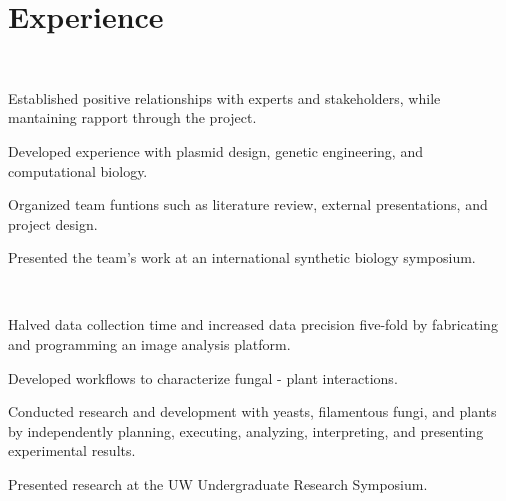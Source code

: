 \documentclass[]{forrest-resume-interfont}
\begin{document}

\section{ Experience}
\\

\begin{tightemize}
    \item Established positive relationships with experts and stakeholders, while mantaining rapport through the project.
    \item Developed experience with plasmid design, genetic engineering, and computational biology.
    \item Organized team funtions such as literature review, external presentations, and project design.
    \item Presented the team's work at an international synthetic biology symposium.
\end{tightemize}


\spacesep


\\

\begin{tightemize}
    \item Halved data collection time and increased data precision five-fold by fabricating and programming an image analysis platform.
    \item Developed workflows to characterize fungal - plant interactions.
    \item Conducted research and development with yeasts, filamentous fungi, and plants by independently planning, executing, analyzing, interpreting, and presenting experimental results. 
    \item Presented research at the UW Undergraduate Research Symposium.
\end{tightemize}
\linesep
\end{document}
